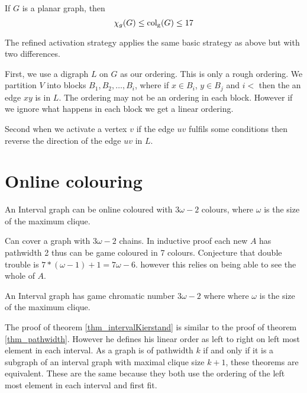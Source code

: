 \begin{theorem}
    If $G$ is a planar graph, then \[\chi_g(G)\leq\operatorname{col_g}(G)\leq17\]
\end{theorem}

The refined activation strategy applies the same basic strategy as above but with two differences. 

First, we use a digraph $L$ on $G$ as our ordering. This is only a rough ordering. We partition $V$ into blocks $B_1,B_2,\dots,B_i$, where if $x \in B_i$, $y \in B_j$ and $i <$ then the an edge $xy$ is in $L$. The ordering may not be an ordering in each block. However if we ignore what happens in each block we get a linear ordering.

Second when we activate a vertex $v$ if the edge $uv$ fulfils some conditions then reverse the direction of the edge $uv$ in $L$.

\section{Online colouring}

\begin{theorem}
    An Interval graph can be online coloured with $3\omega-2$ colours, where $\omega$ is the size of the maximum clique.
\end{theorem}

Can cover a graph with $ 3\omega-2 $ chains. In inductive proof each new $ A $ has pathwidth 2 thus can be game coloured in 7 colours. Conjecture that double trouble is $ 7*(\omega-1)+1 = 7\omega-6 $. however this relies on being able to see the whole of $ A $.

\begin{theorem} \label{thm_intervalKierstand}
    An Interval graph has game chromatic number $3\omega-2$ where where $\omega$ is the size of the maximum clique.
\end{theorem}

The proof of theorem \ref{thm_intervalKierstand} is similar to the proof of theorem \ref{thm_pathwidth}. 
However he defines his linear order as left to right on left most element in each interval.  
As a graph is of pathwidth $k$ if and only if it is a subgraph of an interval graph with maximal clique size $k+1$, these theorems are equivalent. These are the same because they both use the ordering of the left most element in each interval and first fit.        


















